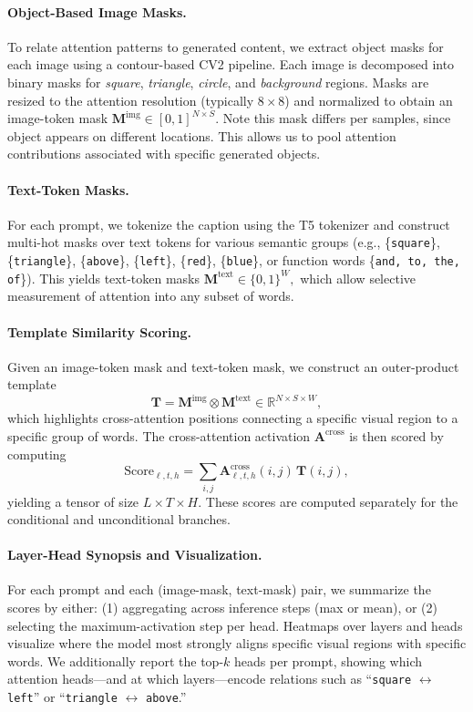 \documentclass[10pt,twocolumn,letterpaper]{article}
\begin{document}
\paragraph{Object-Based Image Masks.}
To relate attention patterns to generated content, we extract object masks for each image using a contour-based CV2 pipeline. Each image is decomposed into binary masks for \textit{square}, \textit{triangle}, \textit{circle}, and \textit{background} regions. Masks are resized to the attention resolution (typically $8 \times 8$) and normalized to obtain an image-token mask
$\mathbf{M}^{\text{img}} \in [0,1]^{N \times S}$. Note this mask differs per samples, since object appears on different locations. 
This allows us to pool attention contributions associated with specific generated objects.

\paragraph{Text-Token Masks.}
For each prompt, we tokenize the caption using the T5 tokenizer and construct multi-hot masks over text tokens for various semantic groups (e.g., \{\texttt{square}\}, \{\texttt{triangle}\}, \{\texttt{above}\}, \{\texttt{left}\}, \{\texttt{red}\}, \{\texttt{blue}\}, or function words \{\texttt{and, to, the, of}\}). This yields text-token masks $\mathbf{M}^{\text{text}} \in \{0,1\}^{W},$
which allow selective measurement of attention into any subset of words.

\paragraph{Template Similarity Scoring.}
Given an image-token mask and text-token mask, we construct an outer-product template
\[
\mathbf{T} = \mathbf{M}^{\text{img}} \otimes \mathbf{M}^{\text{text}} \in \mathbb{R}^{N \times S \times W},
\]
which highlights cross-attention positions connecting a specific visual region to a specific group of words. The cross-attention activation $\mathbf{A}^{\text{cross}}$ is then scored by computing
\[
\mathrm{Score}_{\ell,t,h} = 
\sum_{i,j} 
\mathbf{A}^{\text{cross}}_{\ell,t,h}(i,j)\,\mathbf{T}(i,j),
\]
yielding a tensor of size $L \times T \times H$. These scores are computed separately for the conditional and unconditional branches.

\paragraph{Layer-Head Synopsis and Visualization.}
For each prompt and each (image-mask, text-mask) pair, we summarize the scores by either:
(1) aggregating across inference steps (max or mean), or 
(2) selecting the maximum-activation step per head. Heatmaps over layers and heads visualize where the model most strongly aligns specific visual regions with specific words. We additionally report the top-$k$ heads per prompt, showing which attention heads—and at which layers—encode relations such as “\texttt{square} $\leftrightarrow$ \texttt{left}” or “\texttt{triangle} $\leftrightarrow$ \texttt{above}.”
\end{document}
